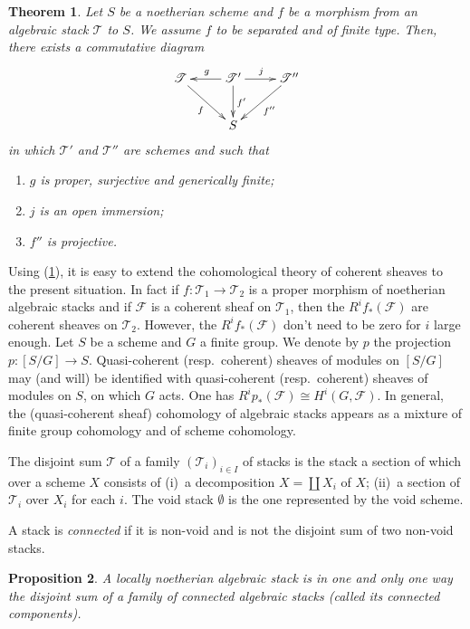 \documentclass[10pt]{amsart}
\theoremstyle{plain}
\newtheorem{theorem}{Theorem}[section]
\newtheorem{proposition}[theorem]{Proposition}
\theoremstyle{definition}
\begin{document}
\begin{theorem}\label{thm:4.12}
Let $S$ be a noetherian scheme and $f$ be a morphism from an algebraic stack $\mathscr{T}$ to $S$. We assume $f$ to be separated and of finite type. Then, there exists a commutative diagram
\[
\xymatrix{
\mathscr{T} \ar[dr]_f & \mathscr{T}' \ar[l]_g \ar[d]^{f'} \ar[r]^j & \mathscr{T}'' \ar[dl]^{f''} \\
& S
}
\]
in which $\mathscr{T}'$ and $\mathscr{T}''$ are schemes and such that
\begin{enumerate}
\item[(i)] $g$ is proper, surjective and generically finite;
\item[(ii)] $j$ is an open immersion;
\item[(iii)] $f''$ is projective.
\end{enumerate}
\end{theorem}

Using (\ref{thm:4.12}), it is easy to extend the cohomological theory of coherent sheaves to the present situation. In fact if $f: \mathscr{T}_1 \to \mathscr{T}_2$ is a proper morphism of noetherian algebraic stacks and if $\mathscr{F}$ is a coherent sheaf on $\mathscr{T}_1$, then the $R^i f_*(\mathscr{F})$ are coherent sheaves on $\mathscr{T}_2$. However, the $R^i f_*(\mathscr{F})$ don't need to be zero for $i$ large enough. Let $S$ be a scheme and $G$ a finite group. We denote by $p$ the projection $p: [S/G] \to S$. Quasi-coherent (resp.~coherent) sheaves of modules on $[S/G]$ may (and will) be identified with quasi-coherent (resp.~coherent) sheaves of modules on $S$, on which $G$ acts. One has $R^i p_*(\mathscr{F}) \cong H^i(G, \mathscr{F})$. In general, the (quasi-coherent sheaf) cohomology of algebraic stacks appears as a mixture of finite group cohomology and of scheme cohomology.

The disjoint sum $\mathscr{T}$ of a family $(\mathscr{T}_i)_{i \in I}$ of stacks is the stack a section of which over a scheme $X$ consists of (i)~a decomposition $X = \coprod X_i$ of $X$; (ii)~a section of $\mathscr{T}_i$ over $X_i$ for each $i$. The void stack $\emptyset$ is the one represented by the void scheme.

A stack is \emph{connected} if it is non-void and is not the disjoint sum of two non-void stacks.

\begin{proposition}\label{prop:4.13}
A locally noetherian algebraic stack is in one and only one way the disjoint sum of a family of connected algebraic stacks (called its connected components).
\end{proposition}
\end{document}
